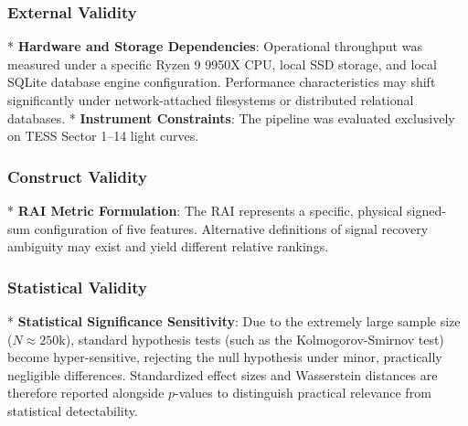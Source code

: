 \subsubsection{External Validity}
*   \textbf{Hardware and Storage Dependencies}: Operational throughput was measured under a specific Ryzen 9 9950X CPU, local SSD storage, and local SQLite database engine configuration. Performance characteristics may shift significantly under network-attached filesystems or distributed relational databases.
*   \textbf{Instrument Constraints}: The pipeline was evaluated exclusively on TESS Sector 1--14 light curves.

\subsubsection{Construct Validity}
*   \textbf{RAI Metric Formulation}: The RAI represents a specific, physical signed-sum configuration of five features. Alternative definitions of signal recovery ambiguity may exist and yield different relative rankings.

\subsubsection{Statistical Validity}
*   \textbf{Statistical Significance Sensitivity}: Due to the extremely large sample size ($N \approx 250\text{k}$), standard hypothesis tests (such as the Kolmogorov-Smirnov test) become hyper-sensitive, rejecting the null hypothesis under minor, practically negligible differences. Standardized effect sizes and Wasserstein distances are therefore reported alongside $p$-values to distinguish practical relevance from statistical detectability.

